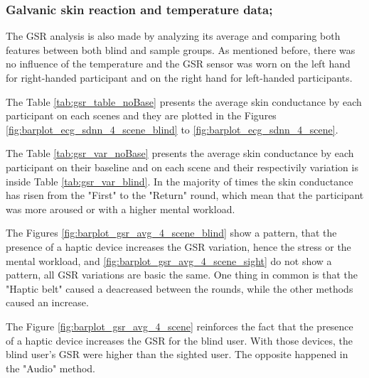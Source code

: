 \subsubsection{Galvanic skin reaction and temperature data;}
\label{subsubsec:results_gsr_temp_2}

The GSR analysis is also made by analyzing its average and comparing both features between both blind and sample groups. As mentioned before, there was no influence of the temperature and the GSR sensor was worn on the left hand for right-handed participant and on the right hand for left-handed participants.

The Table \ref{tab:gsr_table_noBase} presents the average skin conductance by each participant on each scenes and they are plotted in the Figures \ref{fig:barplot_ecg_sdnn_4_scene_blind} to \ref{fig:barplot_ecg_sdnn_4_scene}.

The Table \ref{tab:gsr_var_noBase} presents the average skin conductance by each participant on their baseline and on each scene and their respectivily variation is inside Table \ref{tab:gsr_var_blind}. In the majority of times the skin conductance has risen from the "First" to the "Return" round, which mean that the participant was more aroused or with a higher mental workload.





The Figures \ref{fig:barplot_gsr_avg_4_scene_blind} show a pattern, that the presence of a haptic device increases the GSR variation, hence the stress or the mental workload, and \ref{fig:barplot_gsr_avg_4_scene_sight} do not show a pattern, all GSR variations are basic the same. One thing in common is that the "Haptic belt" caused a deacreased between the rounds, while the other methods caused an increase.

The Figure \ref{fig:barplot_gsr_avg_4_scene} reinforces the fact that the presence of a haptic device increases the GSR for the blind user. With those devices, the blind user's GSR were higher than the sighted user. The opposite happened in the "Audio" method.

